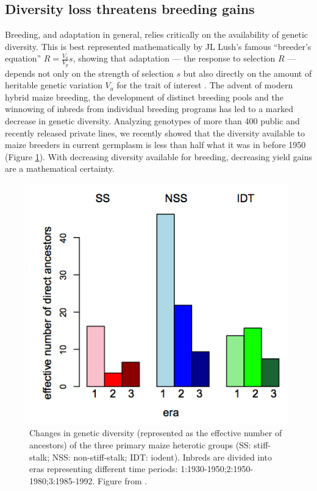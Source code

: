 \documentclass[12pt]{article}
\begin{document}
\subsection{Diversity loss threatens breeding gains}

Breeding, and adaptation in general, relies critically on the availability of genetic diversity. 
This is best represented mathematically by JL Lush's famous ``breeder's equation'' $R=\frac{V_a}{V_p}s$, showing that adaptation --- the response to selection $R$ --- depends not only on the strength of selection $s$ but also directly on the amount of heritable genetic variation $V_a$ for the trait of interest \citep{kelly2011breeder}. 
The advent of modern hybrid maize breeding, the development of distinct breeding pools and the winnowing of inbreds from individual breeding programs has led to a marked decrease in genetic diversity. 
Analyzing genotypes of more than 400 public and recently released private lines, we recently showed that the diversity available to maize breeders in current germplasm is less than half what it was in before 1950 (Figure \ref{diversity}). 
With decreasing diversity available for breeding, decreasing yield gains are a mathematical certainty. 

\begin{figure}
\includegraphics[width=0.5\linewidth]{joost_diversity.png}
\caption{Changes in genetic diversity (represented as the effective number of ancestors) of the three primary maize heterotic groups (SS: stiff-stalk; NSS: non-stiff-stalk; IDT: iodent). Inbreds are divided into eras representing different time periods: 1:1930-1950;2:1950-1980;3:1985-1992. Figure from \citet{van2012historical}.} 
\label{diversity}
\end{figure}
\end{document}
